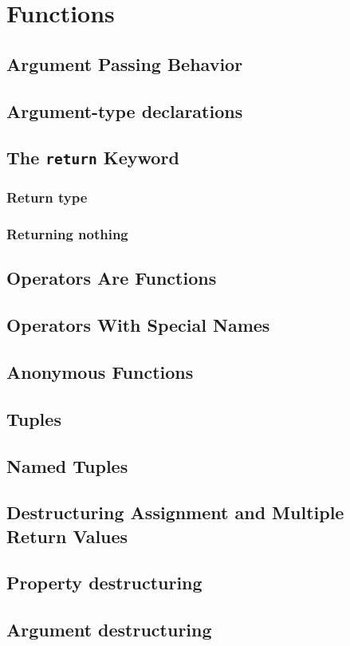 \chapter{Functions}
    \section{Argument Passing Behavior}
    \section{Argument-type declarations}
    \section{The \texttt{return} Keyword}
    \subsection{Return type}
    \subsection{Returning nothing}
    \section{Operators Are Functions}
    \section{Operators With Special Names}
    \section{Anonymous Functions}
    \section{Tuples}
    \section{Named Tuples}
    \section{Destructuring Assignment and Multiple Return Values}
    \section{Property destructuring}
    \section{Argument destructuring}
